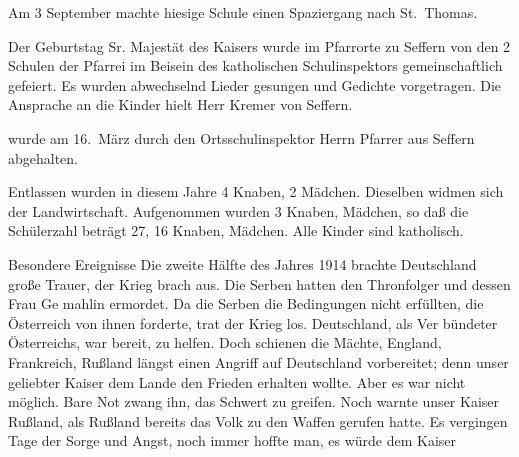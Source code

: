 

\pstart
Am 3 September machte hiesige Schule einen Spaziergang nach St.\ Thomas.

\pend
{}
\pstart


\pend
{}
\pstart

Der Geburtstag Sr. Majestät des Kaisers wurde im Pfarrorte zu\ob
Seffern von den 2 Schulen der Pfarrei im Beisein des katholischen\ob
Schulinspektors gemeinschaftlich gefeiert. Es wurden abwechselnd\ob
Lieder gesungen und Gedichte vorgetragen. Die Ansprache an die\ob
Kinder hielt Herr Kremer von Seffern.

\pend
{}
\pstart

wurde am 16.\ März durch den Ortsschulinspektor Herrn Pfarrer\ob
aus Seffern abgehalten.

\pend
{}
\pstart

Entlassen wurden in diesem Jahre 4 Knaben, 2 Mädchen. Dieselben\ob
widmen sich der Landwirtschaft. Aufgenommen wurden 3 Knaben, Mädchen, so daß die Schülerzahl beträgt 27, 16 Knaben, Mädchen. Alle Kinder sind katholisch.


Besondere Ereignisse\ob
Die zweite Hälfte des Jahres 1914 brachte Deutschland große Trauer, der\ob
Krieg brach aus. Die Serben hatten den Thronfolger und dessen Frau Ge\ohb
mahlin ermordet. Da die Serben die Bedingungen nicht erfüllten, die\ob
Österreich von ihnen forderte, trat der Krieg los. Deutschland, als Ver\ohb
bündeter Österreichs, war bereit, zu helfen. Doch schienen die Mächte,\ob
England, Frankreich, Rußland längst einen Angriff auf Deutschland\ob
vorbereitet; denn unser geliebter Kaiser dem Lande den Frieden erhalten\ob
wollte. Aber es war nicht möglich. Bare Not zwang ihn, das Schwert zu\ob
greifen. Noch warnte unser Kaiser Rußland, als Rußland bereits das\ob
Volk zu den Waffen gerufen hatte. Es vergingen Tage der Sorge und\ob
Angst, noch immer hoffte man, es würde dem Kaiser
\pend

